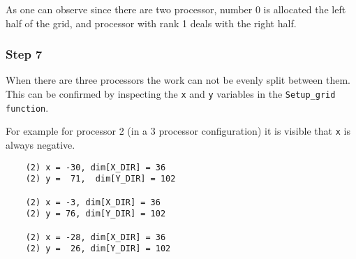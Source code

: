 As one can observe since there are two processor, number 0 is allocated the left half of the grid, and processor with rank 1 deals with the right half.

\subsubsection{Step 7}




When there are three processors the work can not be evenly split between them. This can be confirmed by inspecting the \texttt{x} and \texttt{y} variables in the \texttt{Setup\_grid function}.

For example for processor 2 (in a 3 processor configuration) it is visible that \texttt{x} is always negative.

\begin{lstlisting}
	(2) x = -30, dim[X_DIR] = 36
	(2) y =  71,  dim[Y_DIR] = 102

	(2) x = -3, dim[X_DIR] = 36
	(2) y = 76, dim[Y_DIR] = 102

	(2) x = -28, dim[X_DIR] = 36
	(2) y =  26, dim[Y_DIR] = 102
\end{lstlisting}



